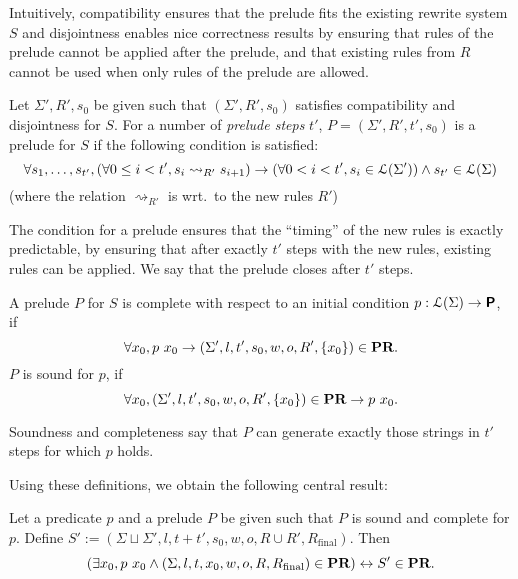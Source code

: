 \documentclass[a4paper,UKenglish,cleveref, autoref]{lipics-v2019}
\newcommand{\TODO}[1]{\ifthenelse{\isundefined{\showTODOs}}{}{\colorbox{red}{\LARGE TODO}:#1}}
\newcommand{\strent}{\rightsquigarrow}
\newcommand{\Rfinal}{R_{\text{final}}}
\begin{document}
Intuitively, compatibility ensures that the prelude fits the existing rewrite system $S$ and disjointness enables nice correctness results by ensuring that rules of the prelude cannot be applied after the prelude, and that existing rules from $R$ cannot be used when only rules of the prelude are allowed. 

\begin{definition}[Prelude]
  Let $\Sigma', R', s_0$ be given such that $(\Sigma', R', s_0)$ satisfies compatibility and disjointness for $S$. 
  For a number of \emph{prelude steps} $t'$, $P = (\Sigma', R', t', s_0)$ is a prelude for $S$ if the following condition is satisfied:
  \[\forall s_1, \ldots, s_{t'}, (\forall 0 \le i < t', s_i \strent_{R'} s_{i+1}) \rightarrow (\forall 0 < i < t', s_i \in \listsofb{\Sigma'}) \land s_{t'} \in \listsofb{\Sigma} \]
  (where the relation $\strent_{R'}$ is wrt.\ to the new rules $R'$) %
\end{definition}
The condition for a prelude ensures that the ``timing'' of the new rules is exactly predictable, by ensuring that after exactly $t'$ steps with the new rules, existing rules can be applied. We say that the prelude closes after $t'$ steps. 

\begin{definition}
  A prelude $P$ for $S$ is complete with respect to an initial condition $p : \mathcal{L} (\Sigma) \rightarrow \textsf{\bfseries P}$, if
  \[ \forall x_0, p~x_0 \rightarrow (\Sigma', l, t', s_0, w, o, R', \{x_0\}) \in \textbf{PR}{}. \]
  $P$ is sound for $p$, if 
  \[ \forall x_0, (\Sigma', l, t', s_0, w, o, R', \{x_0\}) \in \textbf{PR}{} \rightarrow p~x_0. \]
\end{definition}

Soundness and completeness say that $P$ can generate exactly those strings in $t'$ steps for which $p$ holds. 

Using these definitions, we obtain the following central result:
\begin{lemma}\label{lem:prelude}
  Let a predicate $p$ and a prelude $P$ be given such that $P$ is sound and complete for $p$. 
  Define $S' := (\Sigma \sqcup \Sigma', l, t + t', s_0, w, o, R \cup R', \Rfinal)$.
  Then 
  \[(\exists x_0, p~x_0 \land (\Sigma, l, t, x_0, w, o, R, \Rfinal) \in \strconrew{}) \leftrightarrow S' \in \strconrew{}. \]
\end{lemma}

\end{document}
